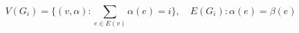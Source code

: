\documentclass{article}
\begin{document}
\[
V(G_i)=\{(v,\alpha):\sum_{e\in E(v)}\alpha(e)=i\},\quad
E(G_i):\alpha(e)=\beta(e)
\]
\end{document}
